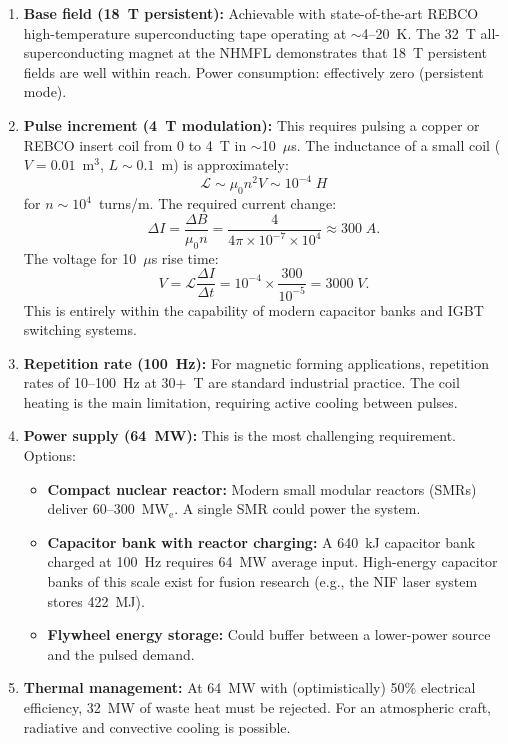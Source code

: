 \documentclass[amsmath,amssymb,aps,prd,superscriptaddress,nofootinbib]{revtex4-2}
\begin{document}
\begin{enumerate}
\item \textbf{Base field (18~T persistent):} Achievable with
  state-of-the-art REBCO high-temperature superconducting tape operating
  at $\sim$4--20~K. The 32~T all-superconducting magnet at the NHMFL
  demonstrates that 18~T persistent fields are well within reach.
  Power consumption: effectively zero (persistent mode).

\item \textbf{Pulse increment (4~T modulation):} This requires pulsing
  a copper or REBCO insert coil from 0 to 4~T in $\sim$10~$\mu$s.
  The inductance of a small coil ($V = 0.01$~m$^3$, $L \sim 0.1$~m)
  is approximately:
  \begin{equation}
  \mathcal{L} \sim \mu_0 n^2 V \sim 10^{-4} \; \si{H}
  \end{equation}
  for $n \sim 10^4$~turns/m. The required current change:
  \begin{equation}
  \Delta I = \frac{\Delta B}{\mu_0 n} = \frac{4}{4\pi \times 10^{-7} \times 10^4}
  \approx 300 \; \si{A}.
  \end{equation}
  The voltage for 10~$\mu$s rise time:
  \begin{equation}
  V = \mathcal{L} \frac{\Delta I}{\Delta t}
  = 10^{-4} \times \frac{300}{10^{-5}} = 3000 \; \si{V}.
  \end{equation}
  This is entirely within the capability of modern capacitor banks
  and IGBT switching systems.

\item \textbf{Repetition rate (100~Hz):} For magnetic forming
  applications, repetition rates of 10--100~Hz at 30+~T are standard
  industrial practice. The coil heating is the main limitation, requiring
  active cooling between pulses.

\item \textbf{Power supply (64~MW):} This is the most challenging
  requirement. Options:
  \begin{itemize}
  \item \textbf{Compact nuclear reactor:} Modern small modular
    reactors (SMRs) deliver 60--300~MW$_\text{e}$. A single SMR
    could power the system.
  \item \textbf{Capacitor bank with reactor charging:} A 640~kJ
    capacitor bank charged at 100~Hz requires 64~MW average input.
    High-energy capacitor banks of this scale exist for fusion
    research (e.g., the NIF laser system stores 422~MJ).
  \item \textbf{Flywheel energy storage:} Could buffer between a
    lower-power source and the pulsed demand.
  \end{itemize}

\item \textbf{Thermal management:} At 64~MW with (optimistically)
  50\% electrical efficiency, 32~MW of waste heat must be rejected.
  For an atmospheric craft, radiative and convective cooling is
  possible.
\end{enumerate}
\end{document}
